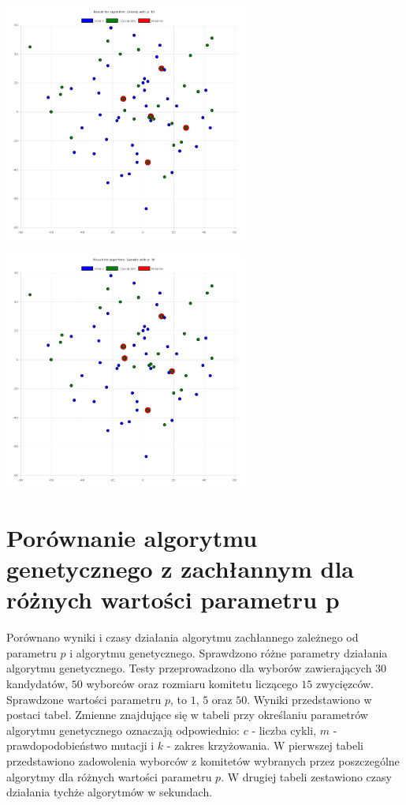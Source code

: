 \documentclass[pdflatex,11pt]{../aghdoc_version2}
\begin{document}
\begin{center}
\centerline{\includegraphics[width=0.6\textwidth]{pics/gg-gr.png}}
\end{center}
\begin{center}
\centerline{\includegraphics[width=0.6\textwidth]{pics/gg-gen.png}}
\end{center}

\vspace*{-2cm}
\section{Porównanie algorytmu genetycznego z zachłannym dla różnych wartości parametru p}

Porównano wyniki i czasy działania algorytmu zachłannego zależnego od parametru $p$ i algorytmu genetycznego. Sprawdzono różne parametry działania algorytmu genetycznego. Testy przeprowadzono dla wyborów zawierających $30$ kandydatów, $50$ wyborców oraz rozmiaru komitetu liczącego $15$ zwycięzców. Sprawdzone wartości parametru $p$, to $1$, $5$ oraz $50$. Wyniki przedstawiono w postaci tabel. Zmienne znajdujące się w tabeli przy określaniu parametrów algorytmu genetycznego oznaczają odpowiednio: $c$ - liczba cykli, $m$ - prawdopodobieństwo mutacji i $k$ - zakres krzyżowania. W pierwszej tabeli przedstawiono zadowolenia wyborców z komitetów wybranych przez poszczególne algorytmy dla różnych wartości parametru $p$. W drugiej tabeli zestawiono czasy działania tychże algorytmów w sekundach.\\
\end{document}
